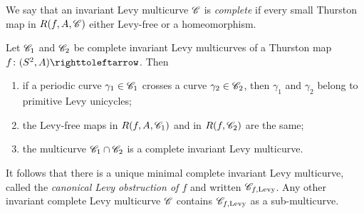 \documentclass{amsart}
\begin{document}
We say that an invariant Levy multicurve ${\mathscr C}$ is \emph{complete} if
every small Thurston map in $R(f,A,{\mathscr C})$ either Levy-free or a
homeomorphism.

\begin{prop}\label{prop:HypLevyMCurvInter}
  Let ${\mathscr C}_1$ and ${\mathscr C}_2$ be complete invariant Levy multicurves of a
  Thurston map $f\colon(S^2,A)\selfmap$. Then
  \begin{enumerate}
  \item if a periodic curve $\gamma_1\in{\mathscr C}_1$ crosses a curve
    $\gamma_2\in {\mathscr C}_2$, then $\gamma_1$ and $\gamma_2$ belong to
    primitive Levy unicycles;\label{prop:HypLevyMCurvInter:1}
  \item the Levy-free maps in $R(f,A,{\mathscr C}_1)$ and in $R(f,{\mathscr C}_2)$ are the
    same;\label{prop:HypLevyMCurvInter:2}
  \item the multicurve ${\mathscr C}_1\cap{\mathscr C}_2$ is a complete invariant Levy
    multicurve.\label{prop:HypLevyMCurvInter:3}
  \end{enumerate}
\end{prop}

It follows that there is a unique minimal complete invariant Levy
multicurve, called the \emph{canonical Levy obstruction of $f$} and
written ${\mathscr C}_{f,\text{Levy}}$. Any other invariant complete Levy
multicurve ${\mathscr C}$ contains ${\mathscr C}_{f,\text{Levy}}$ as a sub-multicurve.
\end{document}
